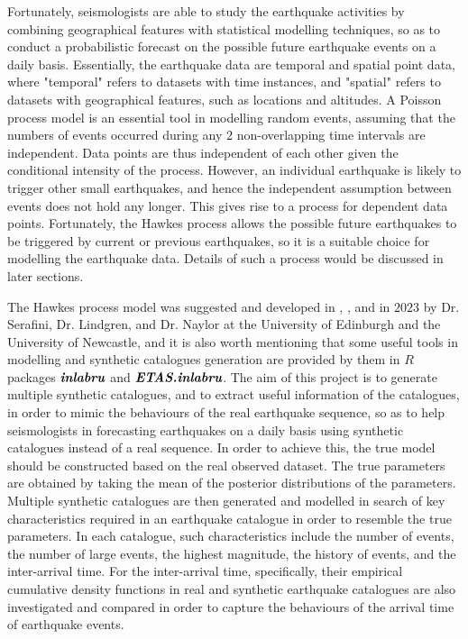 \documentclass[11pt,twoside]{article}
\numberwithin{Theorem}{section}
\numberwithin{Definition}{section}
\numberwithin{Lemma}{section}
\numberwithin{Algorithm}{section}
\numberwithin{equation}{section}
\begin{document}
Fortunately, seismologists are able to study the earthquake activities by combining geographical features with statistical modelling techniques, so as to conduct a probabilistic forecast on the possible future earthquake events on a daily basis. Essentially, the earthquake data are temporal and spatial point data, where "temporal" refers to datasets with time instances, and "spatial" refers to datasets with geographical features, such as locations and altitudes. A Poisson process model is an essential tool in modelling random events, assuming that the numbers of events occurred during any $2$ non-overlapping time intervals are independent. Data points are thus independent of each other given the conditional intensity of the process. However, an individual earthquake is likely to trigger other small earthquakes, and hence the independent assumption between events does not hold any longer. This gives rise to a process for dependent data points. Fortunately, the Hawkes process allows the possible future earthquakes to be triggered by current or previous earthquakes, so it is a suitable choice for modelling the earthquake data. Details of such a process would be discussed in later sections.

The Hawkes process model was suggested and developed in \cite{edinburghseismicityhubTemporalModeld}, \cite{naylor2023bayesian}, and  \cite{serafini2023approximation} in $2023$ by Dr. Serafini, Dr. Lindgren, and Dr. Naylor at the University of Edinburgh and the University of Newcastle, and it is also worth mentioning that some useful tools in modelling and synthetic catalogues generation are provided by them in $\textit{R}$ packages $\textit{\textbf{inlabru}}$ and $\textit{\textbf{ETAS.inlabru}}$. The aim of this project is to generate multiple synthetic catalogues, and to extract useful information of the catalogues, in order to mimic the behaviours of the real earthquake sequence, so as to help seismologists in forecasting earthquakes on a daily basis using synthetic catalogues instead of a real sequence. In order to achieve this, the true model should be constructed based on the real observed dataset. The true parameters are obtained by taking the mean of the posterior distributions of the parameters. Multiple synthetic catalogues are then generated and modelled in search of key characteristics required in an earthquake catalogue in order to resemble the true parameters. In each catalogue, such characteristics include the number of events, the number of large events, the highest magnitude, the history of events, and the inter-arrival time. For the inter-arrival time, specifically, their empirical cumulative density functions in real and synthetic earthquake catalogues are also investigated and compared in order to capture the behaviours of the arrival time of earthquake events. 
\end{document}
